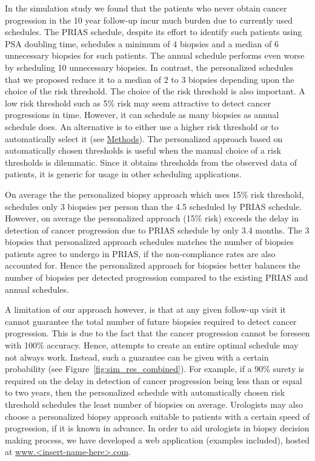 In the simulation study we found that the patients who never obtain cancer progression in the 10 year follow-up incur much burden due to currently used schedules. The PRIAS schedule, despite its effort to identify such patients using PSA doubling time, schedules a minimum of 4 biopsies and a median of 6 unnecessary biopsies for such patients. The annual schedule performs even worse by scheduling 10 unnecessary biopsies. In contrast, the personalized schedules that we proposed reduce it to a median of 2 to 3 biopsies depending upon the choice of the risk threshold. The choice of the risk threshold is also important. A low risk threshold such as 5\% risk may seem attractive to detect cancer progressions in time. However, it can schedule as many biopsies as annual schedule does. An alternative is to either use a higher risk threshold or to automatically select it (see \hyperref[sec:methods]{Methods}). The personalized approach based on automatically chosen thresholds is useful when the manual choice of a risk thresholds is dilemmatic. Since it obtains thresholds from the observed data of patients, it is generic for usage in other scheduling applications.

On average the the personalized biopsy approach which uses 15\% risk threshold, schedules only 3 biopsies per person than the 4.5 scheduled by PRIAS schedule. However, on average the personalized approach (15\% risk) exceeds the delay in detection of cancer progression due to PRIAS schedule by only 3.4 months. The 3 biopsies that personalized approach schedules matches the number of biopsies patients agree to undergo in PRIAS, if the non-compliance rates \cite{bokhorst2015compliance} are also accounted for. Hence the personalized approach for biopsies better balances the number of biopsies per detected progression compared to the existing PRIAS and annual schedules.

A limitation of our approach however, is that at any given follow-up visit it cannot guarantee the total number of future biopsies required to detect cancer progression. This is due to the fact that the cancer progression cannot be foreseen with 100\% accuracy. Hence, attempts to create an entire optimal schedule may not always work. Instead, such a guarantee can be given with a certain probability (see Figure~\ref{fig:sim_res_combined}). For example, if a 90\% surety is required on the delay in detection of cancer progression being less than or equal to two years, then the personalized schedule with automatically chosen risk threshold schedules the least number of biopsies on average. Urologists may also choose a personalized biopsy approach suitable to patients with a certain speed of progression, if it is known in advance. In order to aid urologists in biopsy decision making process, we have developed a web application (examples included), hosted at \url{www.<insert-name-here>.com}.
 


